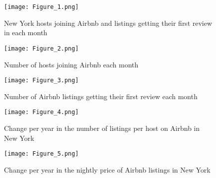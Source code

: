 
\begin{figure}[h!] \centering
\caption{New York hosts joining Airbnb and listings getting their first review
in each month}
    \texttt{[image: Figure\_1.png]}
    \label{fig:number_of_airbnb_listing}

\end{figure}


\begin{figure}[h!] \centering
\caption{Number of hosts joining Airbnb each month}
    \texttt{[image: Figure\_2.png]}
    \label{fig:number_of_hosts_joining}

\end{figure}


\begin{figure}[h!] \centering
    \caption{Number of Airbnb listings getting their first review each month}
    \texttt{[image: Figure\_3.png]}
    \label{}
\end{figure}


\begin{figure}[h!] \centering
\caption{Change per year in the number of listings per host on Airbnb in New
York}
    \texttt{[image: Figure\_4.png]}
    \label{}
\end{figure}


\begin{figure}[h!] \centering
\caption{Change per year in the nightly price of Airbnb listings in New York}
    \texttt{[image: Figure\_5.png]}
    \label{}
\end{figure}



